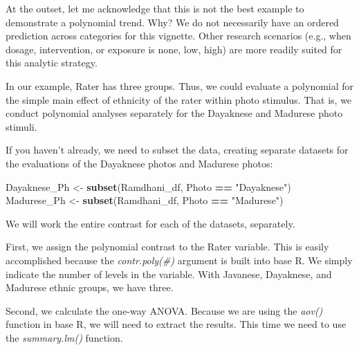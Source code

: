 \documentclass[
  11pt,
]{book}
\newenvironment{Shaded}{\begin{snugshade}}{\end{snugshade}}
\newcommand{\AttributeTok}[1]{\textcolor[rgb]{0.27,0.27,0.27}{#1}}
\newcommand{\DecValTok}[1]{\textcolor[rgb]{0.06,0.06,0.06}{#1}}
\newcommand{\FunctionTok}[1]{\textcolor[rgb]{0.27,0.27,0.27}{\textbf{#1}}}
\newcommand{\NormalTok}[1]{#1}
\newcommand{\OtherTok}[1]{\textcolor[rgb]{0.37,0.37,0.37}{#1}}
\newcommand{\SpecialCharTok}[1]{\textcolor[rgb]{0.43,0.43,0.43}{\textbf{#1}}}
\newcommand{\StringTok}[1]{\textcolor[rgb]{0.5,0.5,0.5}{#1}}
\begin{document}
At the outset, let me acknowledge that this is not the best example to demonstrate a polynomial trend. Why? We do not necessarily have an ordered prediction across categories for this vignette. Other research scenarios (e.g., when dosage, intervention, or exposure is none, low, high) are more readily suited for this analytic strategy.

In our example, Rater has three groups. Thus, we could evaluate a polynomial for the simple main effect of ethnicity of the rater within photo stimulus. That is, we conduct polynomial analyses separately for the Dayaknese and Madurese photo stimuli.

If you haven't already, we need to subset the data, creating separate datasets for the evaluations of the Dayaknese photos and Madurese photos:

\begin{Shaded}
\begin{Highlighting}[]
\NormalTok{Dayaknese\_Ph }\OtherTok{\textless{}{-}} \FunctionTok{subset}\NormalTok{(Ramdhani\_df, Photo }\SpecialCharTok{==} \StringTok{"Dayaknese"}\NormalTok{)}
\NormalTok{Madurese\_Ph }\OtherTok{\textless{}{-}} \FunctionTok{subset}\NormalTok{(Ramdhani\_df, Photo }\SpecialCharTok{==} \StringTok{"Madurese"}\NormalTok{)}
\end{Highlighting}
\end{Shaded}

We will work the entire contrast for each of the datasets, separately.

First, we assign the polynomial contrast to the Rater variable. This is easily accomplished because the \emph{contr.poly(\#)} argument is built into base R. We simply indicate the number of levels in the variable. With Javanese, Dayaknese, and Madurese ethnic groups, we have three.

Second, we calculate the one-way ANOVA. Because we are using the \emph{aov()} function in base R, we will need to extract the results. This time we need to use the \emph{summary.lm()} function.

\begin{Shaded}
\end{Shaded}
\end{document}
